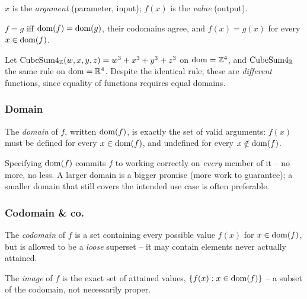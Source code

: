 \documentclass[11pt]{article}
\begin{document}
\begin{note}
$x$ is the \emph{argument} (parameter, input); $f(x)$ is the \emph{value} (output).
\end{note}

\begin{definition}
$f = g$ iff $\operatorname{dom}(f) = \operatorname{dom}(g)$, their codomains agree, and $f(x) = g(x)$ for every $x \in \operatorname{dom}(f)$.
\end{definition}

\begin{example}
Let $\mathrm{CubeSum4}_{\mathbb{Z}}(w,x,y,z) = w^3+x^3+y^3+z^3$ on $\operatorname{dom} = \mathbb{Z}^4$, and $\mathrm{CubeSum4}_{\mathbb{R}}$ the same rule on $\operatorname{dom} = \mathbb{R}^4$. Despite the identical rule, these are \emph{different} functions, since equality of functions requires equal domains.
\end{example}

\subsubsection{Domain}
\label{sec:2-1-1}
\begin{definition}[Domain]
The \emph{domain} of $f$, written $\operatorname{dom}(f)$, is exactly the set of valid arguments: $f(x)$ must be defined for every $x \in \operatorname{dom}(f)$, and undefined for every $x \notin \operatorname{dom}(f)$.
\end{definition}

\begin{note}
Specifying $\operatorname{dom}(f)$ commits $f$ to working correctly on \emph{every} member of it -- no more, no less. A larger domain is a bigger promise (more work to guarantee); a smaller domain that still covers the intended use case is often preferable.
\end{note}

\subsubsection{Codomain \& co.}
\label{sec:2-1-2}
\begin{definition}[Codomain]
The \emph{codomain} of $f$ is a set containing every possible value $f(x)$ for $x \in \operatorname{dom}(f)$, but is allowed to be a \emph{loose} superset -- it may contain elements never actually attained.
\end{definition}

\begin{definition}[Image]
The \emph{image} of $f$ is the exact set of attained values, $\{f(x) : x \in \operatorname{dom}(f)\}$ -- a subset of the codomain, not necessarily proper.
\end{definition}
\end{document}
